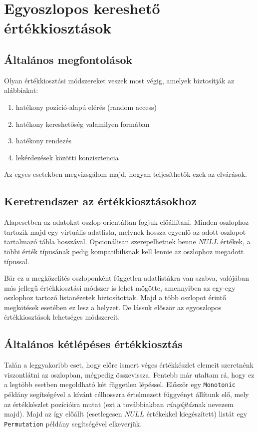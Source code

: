 \documentclass[
    parspace,
    noindent,
    nohyp,
]{elteiktdk}[2023/04/10]
\begin{document}
\section{Egyoszlopos kereshető értékkiosztások}

\subsection{Általános megfontolások}

Olyan értékkiosztási módszereket veszek most végig,
amelyek biztosítják az alábbiakat:

\begin{enumerate}
  \item hatékony pozíció-alapú elérés (random access)
  \item hatékony kereshetőség valamilyen formában
  \item hatékony rendezés
  \item lekérdezések közötti konzisztencia
\end{enumerate}

Az egyes esetekben megvizsgálom majd, hogyan teljesíthetők ezek az elvárások.

\subsection{Keretrendszer az értékkiosztásokhoz}

Alapesetben az adatokat oszlop-orientáltan fogjuk előállítani.
Minden oszlophoz tartozik majd egy virtuális adatlista,
melynek hossza egyenlő az adott oszlopot tartalmazó tábla hosszával.
Opcionálisan szerepelhetnek benne $NULL$ értékek,
a többi érték típusának pedig kompatibilisnak kell lennie az oszlophoz megadott típussal.

Bár ez a megközelítés oszloponként független adatlistákra van szabva,
valójában más jellegű értékkiosztási módszer is lehet mögötte,
amennyiben az egy-egy oszlophoz tartozó listanézetek biztosítottak.
Majd a több oszlopot érintő megkötések esetében ez lesz a helyzet.
De lássuk először az egyoszlopos értékkiosztások lehetséges módszereit.

\subsection{Általános kétlépéses értékkiosztás}

Talán a leggyakoribb eset,
hogy előre ismert véges értékkészlet elemeit szeretnénk viszontlátni az oszlopban,
mégpedig összevissza.
Fentebb már utaltam rá, hogy ez a legtöbb esetben megoldható két független lépéssel.
Először egy \texttt{Monotonic} példány segítségével a kívánt célhosszra
értelmezett függvényt állítunk elő, mely az értékkészlet pozícióira mutat
(ezt a továbbiakban \textit{rányújtás}nak nevezem majd).
Majd az így előállt (esetlegesen $NULL$ értékekkel kiegészített) listát
egy \texttt{Permutation} példány segítségével elkeverjük.
\end{document}
